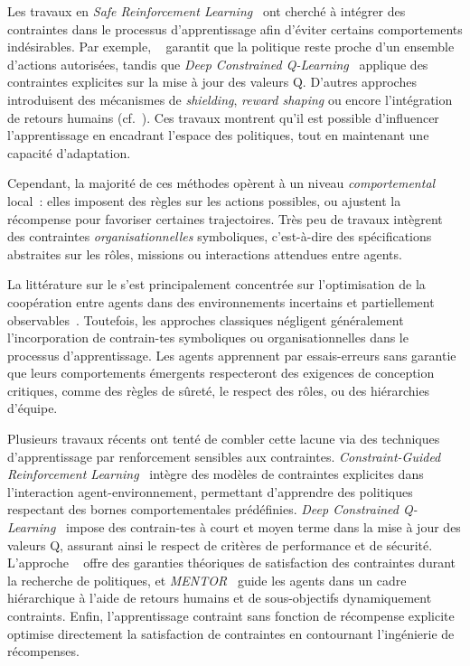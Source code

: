 \medskip

\noindent
Les travaux en \textit{Safe Reinforcement Learning}~\cite{garcia2015comprehensive} ont cherché à intégrer des contraintes dans le processus d'apprentissage afin d'éviter certains comportements indésirables. Par exemple, ~\cite{achiam2017constrained} garantit que la politique reste proche d'un ensemble d'actions autorisées, tandis que \textit{Deep Constrained Q-Learning}~\cite{kalweit2020deep} applique des contraintes explicites sur la mise à jour des valeurs Q. D'autres approches introduisent des mécanismes de \textit{shielding}, \textit{reward shaping} ou encore l'intégration de retours humains (cf.~\cite{zhou2025mentor}). Ces travaux montrent qu'il est possible d'influencer l'apprentissage en encadrant l'espace des politiques, tout en maintenant une capacité d'adaptation.

\noindent
Cependant, la majorité de ces méthodes opèrent à un niveau \textit{comportemental} local~: elles imposent des règles sur les actions possibles, ou ajustent la récompense pour favoriser certaines trajectoires. Très peu de travaux intègrent des contraintes \textit{organisationnelles} symboliques, c'est-à-dire des spécifications abstraites sur les rôles, missions ou interactions attendues entre agents.

\medskip

\noindent
La littérature sur le  s'est principalement concentrée sur l'optimisation de la coopération entre agents dans des environnements incertains et partiellement observables~\cite{Zhang2021, Papoudakis2021}. Toutefois, les approches classiques négligent généralement l'incorporation de contrain-tes symboliques ou organisationnelles dans le processus d'apprentissage. Les agents apprennent par essais-erreurs sans garantie que leurs comportements émergents respecteront des exigences de conception critiques, comme des règles de sûreté, le respect des rôles, ou des hiérarchies d'équipe.

\noindent
Plusieurs travaux récents ont tenté de combler cette lacune via des techniques d'apprentissage par renforcement sensibles aux contraintes. \textit{Constraint-Guided Reinforcement Learning}~\cite{spieker2021constraint} intègre des modèles de contraintes explicites dans l'interaction agent-environnement, permettant d'apprendre des politiques respectant des bornes comportementales prédéfinies. \textit{Deep Constrained Q-Learning}~\cite{kalweit2020deep} impose des contrain-tes à court et moyen terme dans la mise à jour des valeurs Q, assurant ainsi le respect de critères de performance et de sécurité. L'approche ~\cite{achiam2017constrained} offre des garanties théoriques de satisfaction des contraintes durant la recherche de politiques, et \textit{MENTOR}~\cite{zhou2025mentor} guide les agents dans un cadre hiérarchique à l'aide de retours humains et de sous-objectifs dynamiquement contraints. Enfin, l'apprentissage contraint sans fonction de récompense explicite~\cite{miryoosefi2022} optimise directement la satisfaction de contraintes en contournant l'ingénierie de récompenses.

